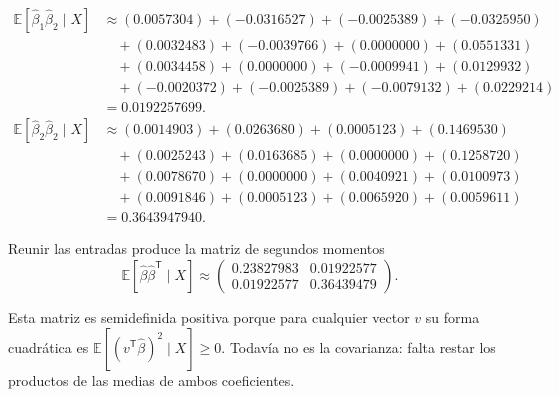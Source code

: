\documentclass[11pt,a4paper]{article}
\newcommand{\E}{\mathbb E}
\newcommand{\T}{^{\mathsf T}}
\begin{document}
\[
\begin{aligned}
\E[\widehat\beta_1\widehat\beta_2\mid X]&\approx(0.0057304)+(-0.0316527)+(-0.0025389)+(-0.0325950)\\&\quad+(0.0032483)+(-0.0039766)+(0.0000000)+(0.0551331)\\&\quad+(0.0034458)+(0.0000000)+(-0.0009941)+(0.0129932)\\&\quad+(-0.0020372)+(-0.0025389)+(-0.0079132)+(0.0229214)\\&=0.0192257699.\end{aligned}
\]
\[
\begin{aligned}
\E[\widehat\beta_2\widehat\beta_2\mid X]&\approx(0.0014903)+(0.0263680)+(0.0005123)+(0.1469530)\\&\quad+(0.0025243)+(0.0163685)+(0.0000000)+(0.1258720)\\&\quad+(0.0078670)+(0.0000000)+(0.0040921)+(0.0100973)\\&\quad+(0.0091846)+(0.0005123)+(0.0065920)+(0.0059611)\\&=0.3643947940.\end{aligned}
\]

Reunir las entradas produce la matriz de segundos momentos
\[
\E[\widehat\beta\widehat\beta\T\mid X]\approx\begin{pmatrix}0.23827983&0.01922577\\0.01922577&0.36439479\end{pmatrix}.
\]

Esta matriz es semidefinida positiva porque para cualquier
vector \(v\) su forma cuadrática es
\(\E[(v\T\widehat\beta)^2\mid X]\ge0\).
Todavía no es la covarianza: falta restar los productos
de las medias de ambos coeficientes.
\endgroup

\clearpage
\end{document}
